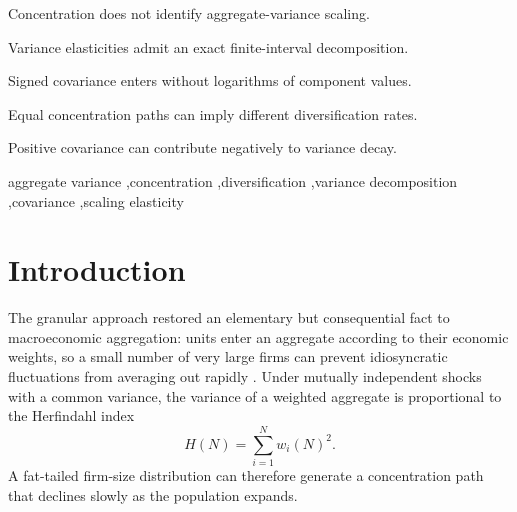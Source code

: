 \documentclass[a4paper,fleqn]{cas-dc}
\begin{document}

\begin{highlights}
\item Concentration does not identify aggregate-variance scaling.
\item Variance elasticities admit an exact finite-interval decomposition.
\item Signed covariance enters without logarithms of component values.
\item Equal concentration paths can imply different diversification rates.
\item Positive covariance can contribute negatively to variance decay.
\end{highlights}


\begin{keywords}
aggregate variance
\sep concentration
\sep diversification
\sep variance decomposition
\sep covariance
\sep scaling elasticity
\end{keywords}



\maketitle


\section{Introduction}
\label{sec:introduction}

The granular approach restored an elementary but consequential fact to
macroeconomic aggregation: units enter an aggregate according to their
economic weights, so a small number of very large firms can prevent
idiosyncratic fluctuations from averaging out rapidly
\citep{gabaix2011}. Under mutually independent shocks with a common
variance, the variance of a weighted aggregate is proportional to the
Herfindahl index
\begin{equation}
    H(N)=\sum_{i=1}^{N}w_i(N)^2.
\end{equation}
A fat-tailed firm-size distribution can therefore generate a
concentration path that declines slowly as the population expands.
\end{document}
